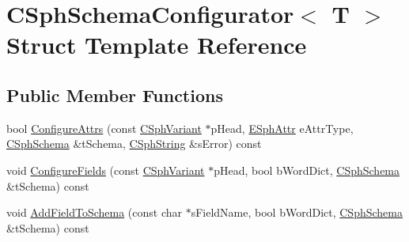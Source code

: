 \hypertarget{structCSphSchemaConfigurator}{\section{C\-Sph\-Schema\-Configurator$<$ T $>$ Struct Template Reference}
\label{structCSphSchemaConfigurator}
}
\subsection*{Public Member Functions}
\begin{DoxyCompactItemize}
\item 
bool \hyperlink{structCSphSchemaConfigurator_a0c67d5ab6dc9d723f597f56754bc1e37}{Configure\-Attrs} (const \hyperlink{structCSphVariant}{C\-Sph\-Variant} $\ast$p\-Head, \hyperlink{sphinxexpr_8h_aa883df0db2e4468a107fdd2d2ae625a3}{E\-Sph\-Attr} e\-Attr\-Type, \hyperlink{classCSphSchema}{C\-Sph\-Schema} \&t\-Schema, \hyperlink{structCSphString}{C\-Sph\-String} \&s\-Error) const 
\item 
void \hyperlink{structCSphSchemaConfigurator_a90abc18bdc2f64997549645cf787cfee}{Configure\-Fields} (const \hyperlink{structCSphVariant}{C\-Sph\-Variant} $\ast$p\-Head, bool b\-Word\-Dict, \hyperlink{classCSphSchema}{C\-Sph\-Schema} \&t\-Schema) const 
\item 
void \hyperlink{structCSphSchemaConfigurator_a960d02c392623c5968215d14c7d541af}{Add\-Field\-To\-Schema} (const char $\ast$s\-Field\-Name, bool b\-Word\-Dict, \hyperlink{classCSphSchema}{C\-Sph\-Schema} \&t\-Schema) const 
\end{DoxyCompactItemize}


